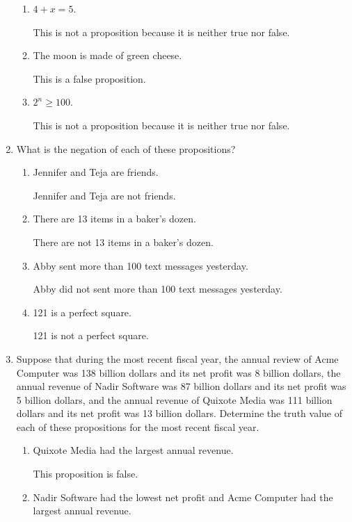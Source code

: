 \documentclass[11pt]{article}
\begin{document}
\begin{enumerate}[label=\textbf{\arabic*.}]
\begin{enumerate}[label=\textbf{\alph*)}]
		\item $4 + x = 5$.
		
		This is not a proposition because it is neither true nor false.
		
		\item The moon is made of green cheese.
		
		This is a false proposition.
		
		\item $2^n \geq 100$.
		
		This is not a proposition because it is neither true nor false.
	\end{enumerate}

	\item What is the negation of each of these propositions?
	\begin{enumerate}[label=\textbf{\alph*)}]
		\item Jennifer and Teja are friends.
		
		Jennifer and Teja are not friends.
		
		\item There are 13 items in a baker's dozen.
		
		There are not 13 items in a baker's dozen.
		
		\item Abby sent more than 100 text messages yesterday.
		
		Abby did not sent more than 100 text messages yesterday.
		
		\item 121 is a perfect square.
		
		121 is not a perfect square.
	\end{enumerate}

	\item  Suppose that during the most recent fiscal year, the annual review of Acme Computer was 138 billion dollars and its net profit was 8 billion dollars, the annual revenue of Nadir Software was 87 billion dollars and its net profit was 5 billion dollars, and the annual revenue of Quixote Media was 111 billion dollars and its net profit was 13 billion dollars. Determine the truth value of each of these propositions for the most recent fiscal year.
	\begin{enumerate}[label=\textbf{\alph*)}]
		\item Quixote Media had the largest annual revenue.
		
		This proposition is false.
		
		\item Nadir Software had the lowest net profit and Acme Computer had the largest annual revenue.
		

\end{enumerate}
\end{enumerate}
\end{document}
